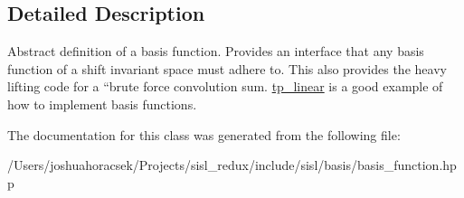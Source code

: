 \subsection{Detailed Description}
Abstract definition of a basis function. Provides an interface that any basis function of a shift invariant space must adhere to. This also provides the heavy lifting code for a ``brute force\textquotesingle{}\textquotesingle{} convolution sum. \hyperlink{classsisl_1_1tp__linear}{tp\+\_\+linear} is a good example of how to implement basis functions. 

The documentation for this class was generated from the following file\+:\begin{DoxyCompactItemize}
\item 
/\+Users/joshuahoracsek/\+Projects/sisl\+\_\+redux/include/sisl/basis/basis\+\_\+function.\+hpp\end{DoxyCompactItemize}
